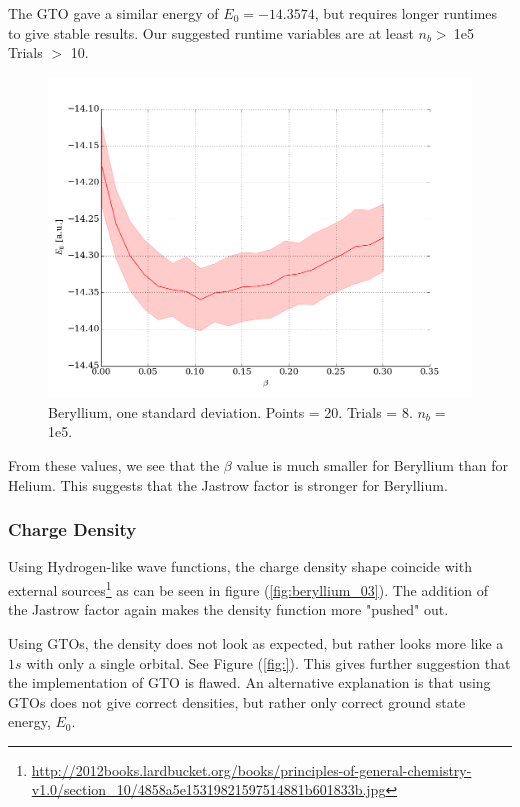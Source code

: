 \documentclass[twocolumns, a4paper,11pt,fleqn]{extarticle}
\begin{document}
\noindent 

The GTO gave a similar energy of $E_0 = -14.3574$, 
but requires longer runtimes to give 
stable results. Our suggested runtime variables are at least $n_b > \:$1e5 Trials $>$ 10.
\begin{figure}[H]
	\includegraphics[width=\columnwidth]{../res/plot/beryllium_01/beryllium_01_pretty.png}
	\caption{Beryllium, one standard deviation. 
	Points = 20. Trials = 8.	$n_b = \:$1e5.}
	\label{fig:beryllium_01}
\end{figure}

From these values, we see that the $\beta$ value is much smaller for Beryllium
than for Helium. This suggests that the Jastrow factor is stronger for
Beryllium. 

\subsubsection{Charge Density}
Using Hydrogen-like wave functions, the charge density shape coincide with external 
sources\footnote{\url{http://2012books.lardbucket.org/books/principles-of-general-chemistry-v1.0/section_10/4858a5e15319821597514881b601833b.jpg}} as can be seen in figure
(\ref{fig:beryllium_03}). The addition of the Jastrow factor again makes the
density function more "pushed" out. 

Using GTOs, the density does not look as expected, but rather
looks more like a $1s$ with only a single orbital. See Figure (\ref{fig:}). 
This gives further suggestion that 
the implementation of GTO is flawed. An alternative explanation is that using
GTOs does not give correct densities, but rather only correct ground state energy, $E_0$.
\end{document}
